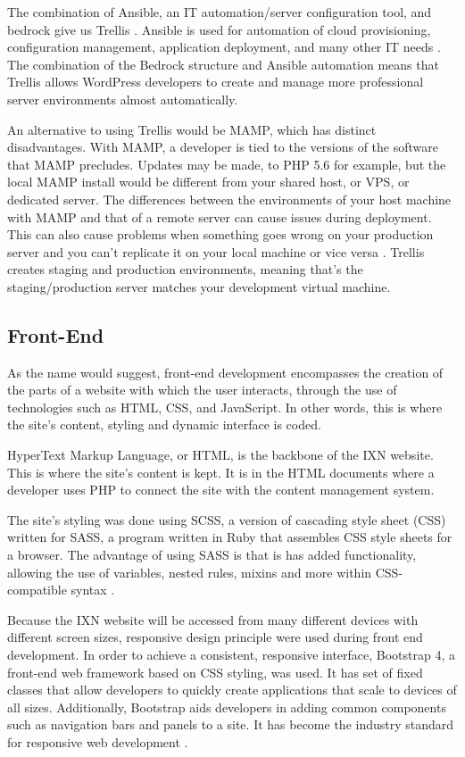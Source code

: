 The combination of Ansible, an IT automation/server configuration tool,
and bedrock give us Trellis \cite{p11}. Ansible is used for automation
of cloud provisioning, configuration management, application deployment,
and many other IT needs \cite{p12}. The combination of the Bedrock
structure and Ansible automation means that Trellis allows WordPress
developers to create and manage more professional server environments
almost automatically.

An alternative to using Trellis would be MAMP, which has distinct
disadvantages. With MAMP, a developer is tied to the versions of the
software that MAMP precludes. Updates may be made, to PHP 5.6 for
example, but the local MAMP install would be different from your shared
host, or VPS, or dedicated server. The differences between the
environments of your host machine with MAMP and that of a remote server
can cause issues during deployment. This can also cause problems when
something goes wrong on your production server and you can't replicate
it on your local machine or vice versa \cite{p13} . Trellis creates
staging and production environments, meaning that's the
staging/production server matches your development virtual machine.

\hypertarget{front-end}{%
\subsection{Front-End}\label{front-end}}

As the name would suggest, front-end development encompasses the
creation of the parts of a website with which the user interacts,
through the use of technologies such as HTML, CSS, and JavaScript. In
other words, this is where the site's content, styling and dynamic
interface is coded.

HyperText Markup Language, or HTML, is the backbone of the IXN website.
This is where the site's content is kept. It is in the HTML documents
where a developer uses PHP to connect the site with the content
management system.

The site's styling was done using SCSS, a version of cascading style
sheet (CSS) written for SASS, a program written in Ruby that assembles
CSS style sheets for a browser. The advantage of using SASS is that is
has added functionality, allowing the use of variables, nested rules,
mixins and more within CSS-compatible syntax \cite{p14} .

Because the IXN website will be accessed from many different devices
with different screen sizes, responsive design principle were used
during front end development. In order to achieve a consistent,
responsive interface, Bootstrap 4, a front-end web framework based on
CSS styling, was used. It has set of fixed classes that allow developers
to quickly create applications that scale to devices of all sizes.
Additionally, Bootstrap aids developers in adding common components such
as navigation bars and panels to a site. It has become the industry
standard for responsive web development \cite{p15} .

